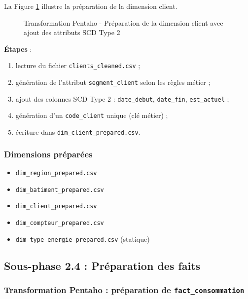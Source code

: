 \documentclass[12pt,a4paper]{report}
\begin{document}
La Figure \ref{fig:dimension_client} illustre la préparation de la dimension client.

\begin{figure}[H]
    \centering
    \caption{Transformation Pentaho - Préparation de la dimension client avec ajout des attributs SCD Type 2}
    \label{fig:dimension_client}
\end{figure}

\textbf{Étapes} :
\begin{enumerate}
    \item lecture du fichier \texttt{clients\_cleaned.csv} ;
    \item génération de l'attribut \texttt{segment\_client} selon les règles métier ;
    \item ajout des colonnes SCD Type 2 : \texttt{date\_debut}, \texttt{date\_fin}, \texttt{est\_actuel} ;
    \item génération d'un \texttt{code\_client} unique (clé métier) ;
    \item écriture dans \texttt{dim\_client\_prepared.csv}.
\end{enumerate}

\subsubsection{Dimensions préparées}

\begin{itemize}
    \item \texttt{dim\_region\_prepared.csv}
    \item \texttt{dim\_batiment\_prepared.csv}
    \item \texttt{dim\_client\_prepared.csv}
    \item \texttt{dim\_compteur\_prepared.csv}
    \item \texttt{dim\_type\_energie\_prepared.csv} (statique)
\end{itemize}

\subsection{Sous-phase 2.4 : Préparation des faits}

\subsubsection{Transformation Pentaho : préparation de \texttt{fact\_consommation}}
\end{document}
